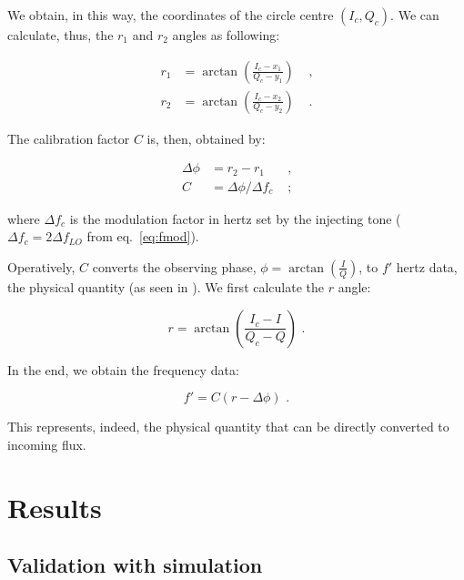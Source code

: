 \documentclass[twocolumn,traditabstract]{aa}\\
\begin{document}
We obtain, in this way, the coordinates of the circle centre $(I_c,Q_c)$. We can calculate, thus, the $r_1$ and $r_2$ angles as following:

\begin{equation}
\begin{align}
r_1 &= \arctan\left( \frac{I_c-x_1}{Q_c - y_1}  \right) &\text{ ,}\\
r_2 &= \arctan\left( \frac{I_c-x_2}{Q_c - y_2}  \right) &\text{ .}
\end{align}
\end{equation}

\noindent The calibration factor $C$ is, then, obtained by:

\begin{equation}
\begin{align}
\Delta \phi &= r_2-r_1 &\text{ ,}\\
C&=\Delta\phi/\Delta f_c &\text{ ;}
\end{align}
\end{equation}

\noindent where $\Delta f_c$ is the modulation factor in hertz set by the injecting tone ($\Delta f_c = 2\Delta f_{LO}$ from eq.~\ref{eq:fmod}).

Operatively, $C$ converts the observing phase, $\phi=\arctan\left( \frac{I}{Q} \right)$, to $f'$ hertz data, the physical quantity (as seen in \cite{Swenson}). We first calculate the $r$ angle:


\begin{equation}
r = \arctan \left( \frac{I_c - I}{Q_c - Q} \right) \text{ .}
\end{equation}

\noindent In the end, we obtain the frequency data:

\begin{equation}
f' = C (r-\Delta\phi) \text{ .}
\end{equation}

\noindent This represents, indeed, the physical quantity that can be directly converted to incoming flux.


\section{Results}
\label{sec:results}

\subsection{Validation with simulation}
\end{document}
